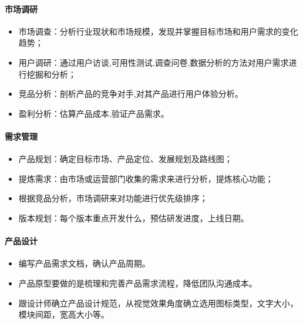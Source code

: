 \documentclass[letterpaper,10pt,english]{sphinxmanual}
\begin{document}
\paragraph{市场调研}
\label{\detokenize{chapter_project/process:id6}}\begin{itemize}
\item {} 
市场调查：分析行业现状和市场规模，发现并掌握目标市场和用户需求的变化趋势；

\item {} 
用户调研：通过用户访谈,可用性测试,调查问卷,数据分析的方法对用户需求进行挖掘和分析；

\item {} 
竞品分析：剖析产品的竞争对手,对其产品进行用户体验分析。

\item {} 
盈利分析：估算产品成本,验证产品需求。

\end{itemize}


\paragraph{需求管理}
\label{\detokenize{chapter_project/process:id7}}\begin{itemize}
\item {} 
产品规划：确定目标市场、产品定位、发展规划及路线图；

\item {} 
提炼需求：由市场或运营部门收集的需求来进行分析，提炼核心功能；

\item {} 
根据竞品分析，市场调研来对功能进行优先级排序；

\item {} 
版本规划：每个版本重点开发什么，预估研发进度，上线日期。

\end{itemize}


\paragraph{产品设计}
\label{\detokenize{chapter_project/process:id8}}\begin{itemize}
\item {} 
编写产品需求文档，确认产品周期。

\item {} 
产品原型要做的是梳理和完善产品需求流程，降低团队沟通成本。

\item {} 
跟设计师确立产品设计规范，从视觉效果角度确立选用图标类型，文字大小，模块间距，宽高大小等。

\end{itemize}
\end{document}
